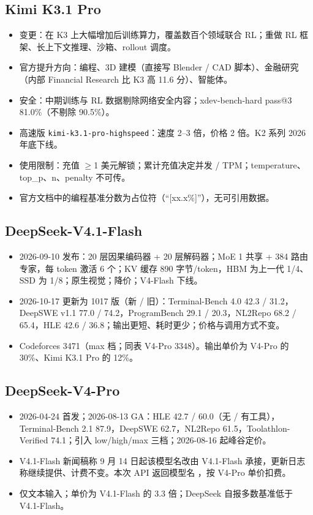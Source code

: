 \documentclass[11pt,a4paper,fontset=none]{ctexart}
\begin{document}
\subsection{Kimi K3.1 Pro}
\begin{itemize}
  \item 变更：在 K3 上大幅增加后训练算力，覆盖数百个领域联合 RL；重做 RL 框架、长上下文推理、沙箱、rollout 调度。
  \item 官方提升方向：编程、3D 建模（直接写 Blender / CAD 脚本）、金融研究（内部 Financial Research 比 K3 高 11.6 分）、智能体。
  \item 安全：中期训练与 RL 数据剔除网络安全内容；xdev-bench-hard pass@3 81.0\%（不剔除 90.5\%）。
  \item 高速版 \texttt{kimi-k3.1-pro-highspeed}：速度 2--3 倍，价格 2 倍。K2 系列 2026 年底下线。
  \item 使用限制：充值 $\ge$1 美元解锁；累计充值决定并发 / TPM；temperature、top\_p、n、penalty 不可传。
  \item 官方文档中的编程基准分数为占位符（“[xx.x\%]”），无可引用数据。
\end{itemize}

\subsection{DeepSeek-V4.1-Flash}
\begin{itemize}
  \item 2026-09-10 发布：20 层因果编码器 + 20 层解码器；MoE 1 共享 + 384 路由专家，每 token 激活 6 个；KV 缓存 890 字节/token，HBM 为上一代 1/4、SSD 为 1/8；原生视觉；降价；V4-Flash 下线。
  \item 2026-10-17 更新为 1017 版（新 / 旧）：Terminal-Bench 4.0 42.3 / 31.2，DeepSWE v1.1 77.0 / 74.2，ProgramBench 29.1 / 20.3，NL2Repo 68.2 / 65.4，HLE 42.6 / 36.8；输出更短、耗时更少；价格与调用方式不变。
  \item Codeforces 3471（max 档；同表 V4-Pro 3348）。输出单价为 V4-Pro 的 30\%、Kimi K3.1 Pro 的 12\%。
\end{itemize}

\subsection{DeepSeek-V4-Pro}
\begin{itemize}
  \item 2026-04-24 首发；2026-08-13 GA：HLE 42.7 / 60.0（无 / 有工具），Terminal-Bench 2.1 87.9，DeepSWE 62.7，NL2Repo 61.5，Toolathlon-Verified 74.1；引入 low/high/max 三档；2026-08-16 起峰谷定价。
  \item V4.1-Flash 新闻稿称 9 月 14 日起该模型名改由 V4.1-Flash 承接，更新日志称继续提供、计费不变。本次 API 返回模型名 \DSProServed，按 V4-Pro 单价扣费。
  \item 仅文本输入；单价为 V4.1-Flash 的 3.3 倍；DeepSeek 自报多数基准低于 V4.1-Flash。
\end{itemize}
\end{document}
